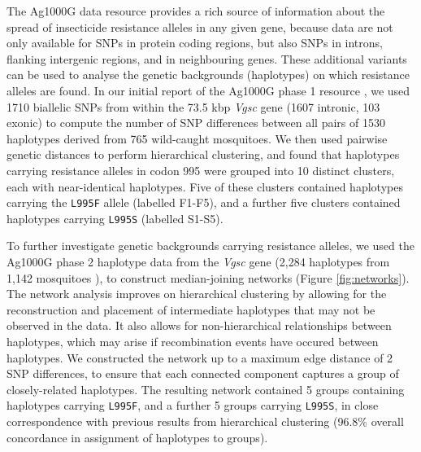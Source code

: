 \documentclass[a4paper,11pt,abstracton,hidelinks]{scrartcl}
\begin{document}
%
The Ag1000G data resource provides a rich source of information about the spread of insecticide resistance alleles in any given gene, because data are not only available for SNPs in protein coding regions, but also SNPs in introns, flanking intergenic regions, and in neighbouring genes.
%
These additional variants can be used to analyse the genetic backgrounds (haplotypes) on which resistance alleles are found.
%
In our initial report of the Ag1000G phase 1 resource \cite{Ag1000gConsortium2017}, we used 1710 biallelic SNPs from within the 73.5 kbp \textit{Vgsc} gene (1607 intronic, 103 exonic) to compute the number of SNP differences between all pairs of 1530 haplotypes derived from 765 wild-caught mosquitoes.
%
We then used pairwise genetic distances to perform hierarchical clustering, and found that haplotypes carrying resistance alleles in codon 995 were grouped into 10 distinct clusters, each with near-identical haplotypes.
%
Five of these clusters contained haplotypes carrying the \texttt{L995F} allele (labelled F1-F5), and a further five clusters contained haplotypes carrying \texttt{L995S} (labelled S1-S5).

%
To further investigate genetic backgrounds carrying resistance alleles, we used the Ag1000G phase 2 haplotype data from the \textit{Vgsc} gene (2,284 haplotypes from 1,142 mosquitoes \cite{clarkson2019genome}), to construct median-joining networks \cite{Bandelt1999} (Figure \ref{fig:networks}).
%
The network analysis improves on hierarchical clustering by allowing for the reconstruction and placement of intermediate haplotypes that may not be observed in the data.
%
It also allows for non-hierarchical relationships between haplotypes, which may arise if recombination events have occured between haplotypes.
%
We constructed the network up to a maximum edge distance of 2 SNP differences, to ensure that each connected component captures a group of closely-related haplotypes.
%
The resulting network contained 5 groups containing haplotypes carrying \texttt{L995F}, and a further 5 groups carrying \texttt{L995S}, in close correspondence with previous results from hierarchical clustering (96.8\% overall concordance in assignment of haplotypes to groups).
%
\end{document}
